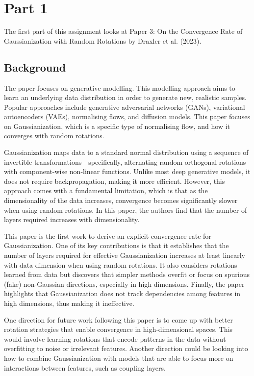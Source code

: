 \documentclass[11pt]{report} %
\begin{document}
\tableofcontents
\newpage

\chapter{Part 1 %
}

The first part of this assignment looks at Paper 3: On the Convergence Rate of Gaussianization with Random Rotations by Draxler et al. (2023).

\section{Background}
The paper focuses on generative modelling. This modelling approach aims to learn an underlying data distribution in order to generate new, realistic samples. Popular approaches include generative adversarial networks (GANs), variational autoencoders (VAEs), normalising flows, and diffusion models. This paper focuses on Gaussianization, which is a specific type of normalising flow, and how it converges with random rotations.

Gaussianization maps data to a standard normal distribution using a sequence of invertible transformations—specifically, alternating random orthogonal rotations with component-wise non-linear functions. Unlike most deep generative models, it does not require backpropagation, making it more efficient.
However, this approach comes with a fundamental limitation, which is that as the dimensionality of the data increases, convergence becomes significantly slower when using random rotations. In this paper, the authors find that the number of layers required increases with dimensionality.

This paper is the first work to derive an explicit convergence rate for Gaussianization. One of its key contributions is that it establishes that the number of layers required for effective Gaussianization increases at least linearly with data dimension when using random rotations. It also considers rotations learned from data but discovers that simpler methods overfit or focus on spurious (fake) non-Gaussian directions, especially in high dimensions. Finally, the paper highlights that Gaussianization does not track dependencies among features in high dimensions, thus making it ineffective.

One direction for future work following this paper is to come up with better rotation strategies that enable convergence in high-dimensional spaces. This would involve learning rotations that encode patterns in the data without overfitting to noise or irrelevant features. Another direction could be looking into how to combine Gaussianization with models that are able to focus more on interactions between features, such as coupling layers.
\end{document}
